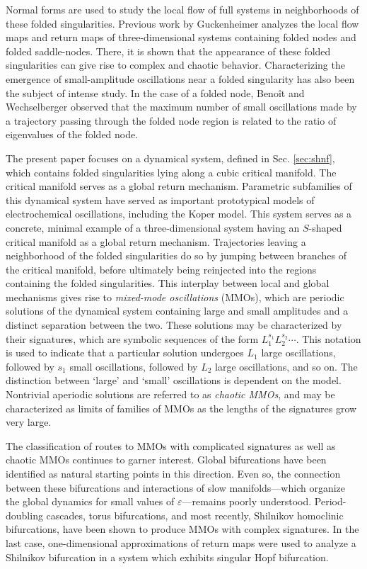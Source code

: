 \documentclass[aip, cha, sd, amsmath,amssymb, preprint]{revtex4-1}
\begin{document}
 Normal forms are used to study the local flow of full systems in neighborhoods of these folded singularities. Previous work by Guckenheimer\cite{guckenheimer2008chaos} analyzes the local flow maps and return maps of three-dimensional systems containing folded nodes and folded saddle-nodes. There, it is shown that the appearance of these folded singularities can give rise to complex and chaotic behavior. Characterizing the emergence of small-amplitude oscillations near a folded singularity has also been the subject of intense study. In the case of a folded node, Beno\^it\cite{benoit1990} and Wechselberger\cite{wechselberger2005} observed that the maximum number of small oscillations made by a trajectory passing through the folded node region is related to the ratio of eigenvalues of the folded node. 

The present paper focuses on a dynamical system, defined in Sec. \ref{sec:shnf}, which contains folded singularities lying along a cubic critical manifold.  The critical manifold serves as a global return mechanism. Parametric subfamilies of this dynamical system have served as important prototypical models of electrochemical oscillations, including the Koper model\cite{koper1992}. This system serves as a concrete, minimal example of a three-dimensional system having an $S$-shaped critical manifold as a global return mechanism. Trajectories leaving a neighborhood of the folded singularities do so by jumping between branches of the critical manifold, before ultimately being reinjected into the regions containing the folded singularities. This interplay between local and global mechanisms gives rise to {\it mixed-mode oscillations} (MMOs), which are periodic solutions of the dynamical system containing large and small amplitudes and a distinct separation between the two. These solutions may be characterized by their signatures, which are symbolic sequences of the form $L_1^{s_1}L_2^{s_2} \cdots$. This notation is used to indicate that a particular solution undergoes $L_1$ large oscillations, followed by $s_1$ small oscillations, followed by $L_2$ large oscillations, and so on. The distinction between `large' and `small' oscillations is dependent on the model. Nontrivial aperiodic solutions are referred to as {\it chaotic MMOs}, and may be characterized as limits of families of MMOs as the lengths of the signatures grow very large.

The classification of routes to MMOs with complicated signatures as well as chaotic MMOs continues to garner interest. Global bifurcations have been identified as natural starting points in this direction. Even so, the connection between these bifurcations and  interactions of slow manifolds---which organize the global dynamics for small values of ${ \varepsilon}$---remains poorly understood. Period-doubling cascades, torus bifurcations,\cite{guckenheimer2008siam} and most recently, Shilnikov homoclinic bifurcations,\cite{guckenheimer2015} have been shown to produce MMOs with complex signatures. In the last case, one-dimensional approximations of return maps were used to analyze a Shilnikov bifurcation in a system which exhibits singular Hopf bifurcation. 
\end{document}
